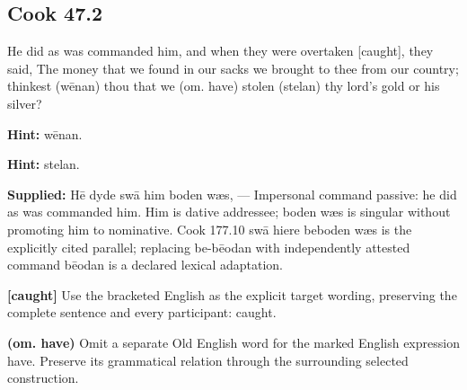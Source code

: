 \par\begin{minipage}{\linewidth}\raggedright
\subsection*{Cook 47.2}

He did as was commanded him, and when they were overtaken [caught], they said, The money that we found in our sacks we brought to thee from our country; thinkest (wēnan) thou that we (om. have) stolen (stelan) thy lord’s gold or his silver?

\textbf{Hint:} wēnan.

\textbf{Hint:} stelan.

\textbf{Supplied:} Hē dyde swā him boden wæs, — Impersonal command passive: he did as was commanded him. Him is dative addressee; boden wæs is singular without promoting him to nominative. Cook 177.10 swā hiere beboden wæs is the explicitly cited parallel; replacing be-bēodan with independently attested command bēodan is a declared lexical adaptation.

\textbf{[caught]} Use the bracketed English as the explicit target wording, preserving the complete sentence and every participant: caught.

\textbf{(om. have)} Omit a separate Old English word for the marked English expression have. Preserve its grammatical relation through the surrounding selected construction.

\end{minipage}\par\addvspace{4pt}

